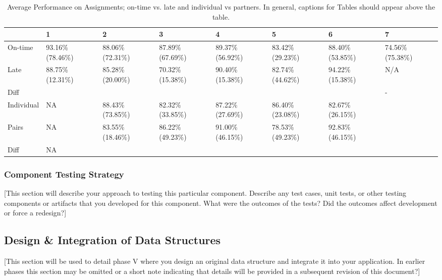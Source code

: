 \documentclass[12pt]{scrartcl} %
\begin{document}
\begin{table}
\centering
\caption{Average Performance on Assignments; on-time vs. late and individual vs partners.  In general, captions for Tables should appear above the table.}
\label{table:assignmentPerformance}
\begin{tabular}{|l|p{1.5cm}|p{1.5cm}|p{1.5cm}|p{1.5cm}|p{1.5cm}|p{1.5cm}|p{1.5cm}|}
\hline
~ & 1 & 2 & 3 & 4 & 5 & 6 & 7 \\
\hline
On-time	& 93.16\% (78.46\%)	& 88.06\% (72.31\%)	& 87.89\% (67.69\%)	& 89.37\% (56.92\%) & 83.42\% (29.23\%) & 88.40\% (53.85\%) & 74.56\% (75.38\%) \\
\hline
Late & 88.75\% (12.31\%) & 85.28\% (20.00\%) & 70.32\% (15.38\%) & 90.40\% (15.38\%) & 82.74\% (44.62\%) & 94.22\% (15.38\%) & N/A \\
\hline
Diff & \color{red}{4.42\%} & \color{red}{2.79\%} & \color{red}{17.57\%} & \color{green}{1.03\%} & \color{red}{0.68\%} & \color{green}{5.82\%} & - \\
\hline
Individual & NA	& 88.43\% (73.85\%) & 82.32\% (33.85\%) & 87.22\% (27.69\%) & 86.40\% (23.08\%) & 82.67\% (26.15\%) & ~\\
\hline
Pairs & NA & 83.55\% (18.46\%) & 86.22\% (49.23\%) & 91.00\% (46.15\%) & 78.53\% (49.23\%) & 92.83\% (46.15\%) & ~\\
\hline
Diff & NA & \color{red}{4.88\%} & \color{green}{3.90\%} & \color{green}{3.78\%} & \color{red}{7.87\%} & \color{green}{10.16\%}	& ~\\
\hline
\end{tabular}
\end{table}

\subsubsection{Component Testing Strategy}

[This section will describe your approach to testing this particular component.  Describe any test cases, unit tests, or other testing components or artifacts that you developed for this component.  What were the outcomes of the tests?  Did the outcomes affect development or force a redesign?]

\subsection{Design \& Integration of Data Structures}

[This section will be used to detail phase V where you design an original data structure and integrate it into your application.  In earlier phases this section may be omitted or a short note indicating that details will be provided in a subsequent revision of this document?]
\end{document}
